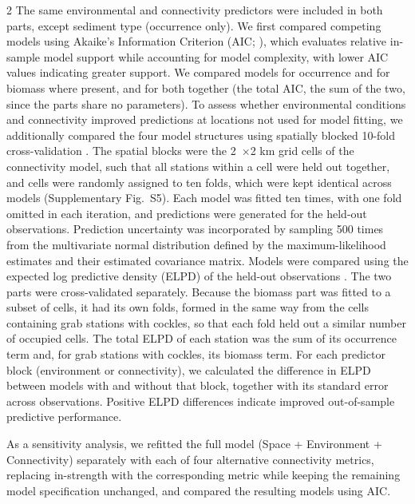 \begin{spacing}{2}
The same environmental and connectivity predictors were included in both parts, except sediment type (occurrence only). We first compared competing models using Akaike’s Information Criterion (AIC; \citet{akaike1974}), which evaluates relative in-sample model support while accounting for model complexity, with lower AIC values indicating greater support. We compared models for occurrence and for biomass where present, and for both together (the total AIC, the sum of the two, since the parts share no parameters).
To assess whether environmental conditions and connectivity improved predictions at locations not used for model fitting, we additionally compared the four model structures using spatially blocked 10-fold cross-validation \citep{roberts2017crossvalidation}. The spatial blocks were the 2~$\times$2 km grid cells of the connectivity model, such that all stations within a cell were held out together, and cells were randomly assigned to ten folds, which were kept identical across models (Supplementary Fig.~S5). Each model was fitted ten times, with one fold omitted in each iteration, and predictions were generated for the held-out observations. Prediction uncertainty was incorporated by sampling 500 times from the multivariate normal distribution defined by the maximum-likelihood estimates and their estimated covariance matrix. Models were compared using the expected log predictive density (ELPD) of the held-out observations \citep{vehtari2017practical}. The two parts were cross-validated separately. Because the biomass part was fitted to a subset of cells, it had its own folds, formed in the same way from the cells containing grab stations with cockles, so that each
fold held out a similar number of occupied cells. The total ELPD of each station was the sum of its occurrence term and, for grab stations with cockles, its biomass term. For each predictor block (environment or connectivity), we calculated the difference in ELPD between models with and without that block, together with its standard error across observations. Positive ELPD differences indicate improved out-of-sample predictive performance.

As a sensitivity analysis, we refitted the full model (Space + Environment + Connectivity) separately with each of four alternative connectivity metrics, replacing in-strength with the corresponding metric while keeping the remaining model specification unchanged, and compared the resulting models using AIC.


\end{spacing}
